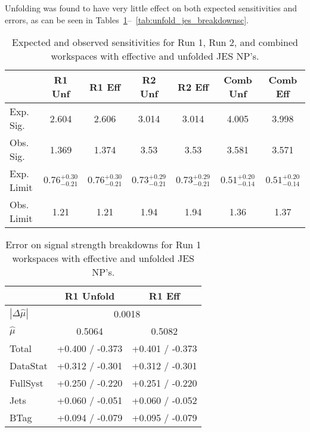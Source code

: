 Unfolding was found to have very little effect on both expected sensitivities and errors, as can be seen in Tables~\ref{tab:unfold_jes_sensitivities}--~\ref{tab:unfold_jes_breakdownsc}.
\begin{table}[!htbp]\captionsetup{justification=centering}
\caption{Expected and observed sensitivities for Run 1, Run 2, and combined workspaces with effective and unfolded JES NP's.}
\begin{center}\begin{tabular}{lcccccc}
\hline\hline
 & R1 Unf & R1 Eff & R2 Unf & R2 Eff & Comb Unf & Comb Eff\\
\hline
Exp. Sig. &  2.604 & 2.606 & 3.014 & 3.014 & 4.005 & 3.998\\
Obs. Sig. & 1.369 & 1.374 & 3.53 & 3.53 & 3.581 & 3.571\\
\hline
Exp. Limit &  $0.76^{+0.30}_{-0.21}$ & $0.76^{+0.30}_{-0.21}$ & $0.73^{+0.29}_{-0.21}$ & $0.73^{+0.29}_{-0.21}$ & $0.51^{+0.20}_{-0.14}$ & $0.51^{+0.20}_{-0.14}$\\
Obs. Limit & 1.21 & 1.21 & 1.94 & 1.94 & 1.36 & 1.37\\
\hline\hline
\end{tabular}
\label{tab:unfold_jes_sensitivities}
\end{center}
\end{table}

\begin{table}[!htbp]\captionsetup{justification=centering}
\caption{Error on signal strength breakdowns for  Run 1 workspaces with effective and unfolded JES NP's.}
\begin{center}\begin{tabular}{lcc}
\hline\hline
 & R1 Unfold & R1 Eff \\
\hline
$\left|\Delta\hat{\mu}\right|$ &  \multicolumn{2}{c}{0.0018} \\
$\hat{\mu}$ & 0.5064 & 0.5082 \\
\hline
Total &  +0.400 / -0.373  &  +0.401 / -0.373  \\
DataStat &  +0.312 / -0.301  &  +0.312 / -0.301\\
FullSyst &  +0.250 / -0.220  &  +0.251 / -0.220\\
\hline
Jets &  +0.060 / -0.051  &  +0.060 / -0.052  \\
BTag &  +0.094 / -0.079  &  +0.095 / -0.079  \\
\hline
\hline
\end{tabular}
\label{tab:unfold_jes_breakdowns1}
\end{center}
\end{table}


